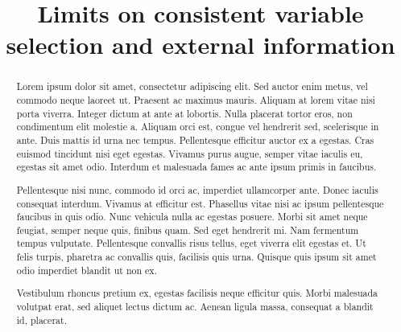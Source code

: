 \documentclass[aos]{imsart}
\theoremstyle{plain}
\begin{document}
\begin{frontmatter}
\title{Limits on consistent variable selection and external information}


\begin{abstract}
Lorem ipsum dolor sit amet, consectetur adipiscing elit. Sed auctor enim metus, vel commodo neque laoreet ut. Praesent ac maximus mauris. Aliquam at lorem vitae nisi porta viverra. Integer dictum at ante at lobortis. Nulla placerat tortor eros, non condimentum elit molestie a. Aliquam orci est, congue vel hendrerit sed, scelerisque in ante. Duis mattis id urna nec tempus. Pellentesque efficitur auctor ex a egestas. Cras euismod tincidunt nisi eget egestas. Vivamus purus augue, semper vitae iaculis eu, egestas sit amet odio. Interdum et malesuada fames ac ante ipsum primis in faucibus.

Pellentesque nisi nunc, commodo id orci ac, imperdiet ullamcorper ante. Donec iaculis consequat interdum. Vivamus at efficitur est. Phasellus vitae nisi ac ipsum pellentesque faucibus in quis odio. Nunc vehicula nulla ac egestas posuere. Morbi sit amet neque feugiat, semper neque quis, finibus quam. Sed eget hendrerit mi. Nam fermentum tempus vulputate. Pellentesque convallis risus tellus, eget viverra elit egestas et. Ut felis turpis, pharetra ac convallis quis, facilisis quis urna. Quisque quis ipsum sit amet odio imperdiet blandit ut non ex.

Vestibulum rhoncus pretium ex, egestas facilisis neque efficitur quis. Morbi malesuada volutpat erat, sed aliquet lectus dictum ac. Aenean ligula massa, consequat a blandit id, placerat.
\end{abstract}

\begin{keyword}
\end{keyword}

\end{frontmatter}
\end{document}
